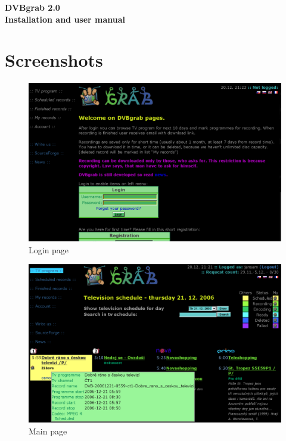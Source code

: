 \documentclass[11pt,twoside,a4paper]{dp_format_en}%
\begin{document}
\parskip 10pt
\begin{center}
\vfill
\vglue 30mm
{\Large\bf DVBgrab 2.0}\\
\vglue 30mm
{\Large\bf Installation and user manual}\\
\vfill
\end{center}

\mainbodystarts

\clearpage



\chapter{Screenshots}
\begin{figure}[ht]
\begin{center}
\includegraphics[width=12cm]{images/scrPrihlaseni}
\caption{Login page}
\label{fig:scr1}
\end{center}
\end{figure}

\nopagebreak 

\begin{figure}[ht]
\begin{center}
\includegraphics[width=12cm]{images/scrProgram}
\caption{Main page}
\label{fig:scr2}
\end{center}
\end{figure}
\end{document}
